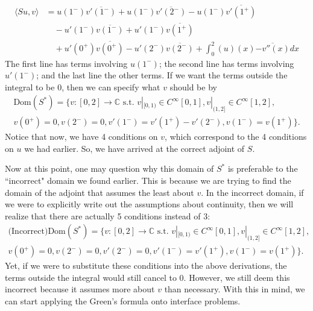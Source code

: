 \documentclass[11pt,reqno,oneside,a4paper]{article}
\begin{document}
\begin{align*}
\langle Su,v \rangle 
&= u(1^-)\overline{v'(1^-)} 
+ u(1^-)\overline{v'(2^-)} 
- u(1^-)\overline{v'(1^+)} \\&\quad 
- u'(1^-)\overline{v(1^-)} 
+ u'(1^-)\overline{v(1^+)} \\&\quad 
+ u'(0^+)\overline{v(0^+)}
- u'(2^-)\overline{v(2^-)}
+ \int_{0}^{2}(u)(x)\overline{-v''(x)}dx
\end{align*}
The first line has terms involving $u(1^-)$; the second line has terms involving $u'(1^-)$; and the last line the other terms. If we want the terms outside the integral to be 0, then we can specify what $v$ should be by
\begin{multline*}
	\text{Dom}(S^*) = \{v:[0,2] \to \mathbb{C} \text{ s.t. } v|_{[0,1)} \in C^\infty[0,1], v|_{(1,2]} \in C^\infty[1,2],\\ v(0^+) = 0, v(2^-) = 0, v'(1^-)=v'(1^+) - v'(2^-), v(1^-)=v(1^+)\}.
\end{multline*}
Notice that now, we have 4 conditions on $v$, which correspond to the 4 conditions on $u$ we had earlier. So, we have arrived at the correct adjoint of $S$.

Now at this point, one may question why this domain of $S^*$ is preferable to the ``incorrect" domain we found earlier. This is because we are trying to find the domain of the adjoint that assumes the least about $v$. In the incorrect domain, if we were to explicitly write out the assumptions about continuity, then we will realize that there are actually 5 conditions instead of 3:
\begin{multline*}
\text{(Incorrect)Dom}(S^*) = \{v:[0,2] \to \mathbb{C} \text{ s.t. } v|_{[0,1)} \in C^\infty[0,1], v|_{(1,2]} \in C^\infty[1,2],\\ v(0^+) = 0, v(2^-) = 0, v'(2^-) = 0, v'(1^-)=v'(1^+), v(1^-)=v(1^+)\}.
\end{multline*}
Yet, if we were to substitute these conditions into the above derivations, the terms outside the integral would still cancel to 0. However, we still deem this incorrect because it assumes more about $v$ than necessary. With this in mind, we can start applying the Green's formula onto interface problems.
\end{document}
